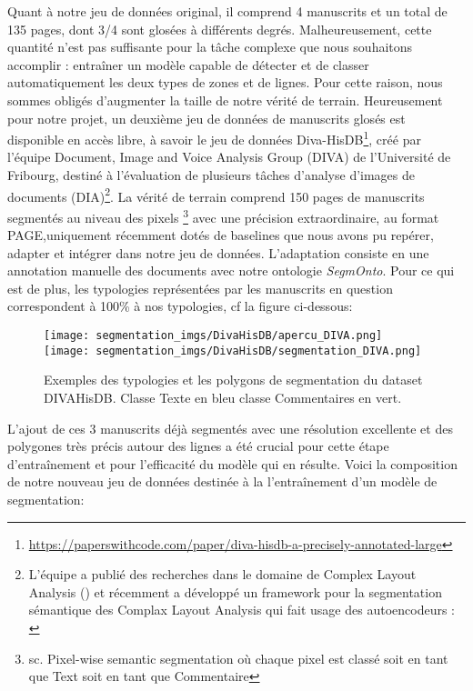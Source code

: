 \documentclass[a4paper, twoside, 12pt]{book}
\begin{document}
Quant à notre jeu de données original, il comprend 4 manuscrits et un total de 135 pages, dont 3/4 sont glosées à différents degrés. Malheureusement, cette quantité n'est pas suffisante pour la tâche complexe que nous souhaitons accomplir : entraîner un modèle capable de détecter et de classer automatiquement les deux types de zones et de lignes. Pour cette raison, nous sommes obligés d'augmenter la taille de notre vérité de terrain. Heureusement pour notre projet, un deuxième jeu de données de manuscrits glosés est disponible en accès libre, à savoir le jeu de données Diva-HisDB\footnote{\url{https://paperswithcode.com/paper/diva-hisdb-a-precisely-annotated-large}}, créé par l'équipe Document, Image and Voice Analysis Group (DIVA) de l'Université de Fribourg, destiné à l'évaluation de plusieurs tâches d'analyse d'images de documents (DIA)\footnote{L'équipe a publié des recherches dans le domaine de Complex Layout Analysis (\cite{simistira2016diva}) et récemment a développé un framework pour la segmentation sémantique des Complax Layout Analysis qui fait usage des autoencodeurs : \cite{vogtlin2022diva}}. La vérité de terrain comprend 150 pages de manuscrits segmentés au niveau des pixels \footnote{sc. Pixel-wise semantic segmentation où chaque pixel est classé soit en tant que \og{}Text\fg{} soit en tant que \og{}Commentaire\fg{}} avec une précision extraordinaire, au format PAGE,uniquement récemment dotés de baselines que nous avons pu repérer, adapter et intégrer dans notre jeu de données. L'adaptation consiste en une annotation manuelle des documents avec notre ontologie \textit{SegmOnto}. Pour ce qui est de plus, les typologies représentées par les manuscrits en question correspondent à 100\% à nos typologies, cf la figure ci-dessous: 


\begin{figure}[H]
  \centering
 {\texttt{[image: segmentation\_imgs/DivaHisDB/apercu\_DIVA.png]}}
  \qquad
  {\texttt{[image: segmentation\_imgs/DivaHisDB/segmentation\_DIVA.png]}}
  \caption{Exemples des typologies et les polygons de segmentation du dataset DIVAHisDB. Classe \og{}Texte\fg{} en bleu classe \og{}Commentaires\fg{} en vert.}
  \label{fig:my_figure}
\end{figure}


L'ajout de ces 3 manuscrits déjà segmentés avec une résolution excellente et des polygones très précis autour des lignes a été crucial pour cette étape d'entraînement et pour l'efficacité du modèle qui en résulte. Voici la composition de notre nouveau jeu de données destinée à la l'entraînement d'un modèle de segmentation:
\end{document}
